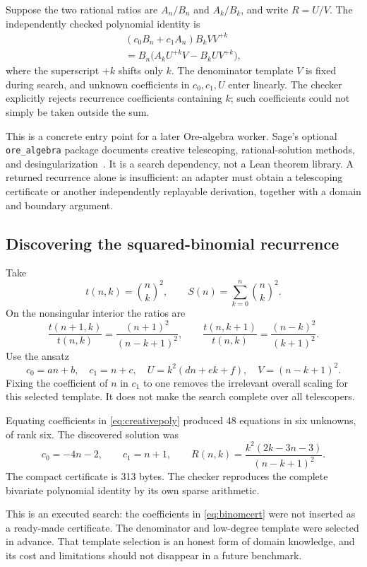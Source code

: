 \documentclass[11pt,letterpaper]{article}
\newcommand{\code}[1]{\texttt{#1}}
\theoremstyle{definition}\newtheorem{definition}[theorem]{Definition}
\theoremstyle{remark}\newtheorem{remark}[theorem]{Remark}
\begin{document}
Suppose the two rational ratios are $A_n/B_n$ and $A_k/B_k$, and write
$R=U/V$. The independently checked polynomial identity is
\begin{multline}
 (c_0B_n+c_1A_n)B_k V V^{+k}\\
 =B_n\bigl(A_k U^{+k}V-B_k U V^{+k}\bigr),
 \label{eq:creativepoly}
\end{multline}
where the superscript $+k$ shifts only $k$. The denominator template $V$ is
fixed during search, and unknown coefficients in $c_0,c_1,U$ enter linearly.
The checker explicitly rejects recurrence coefficients containing $k$; such
coefficients could not simply be taken outside the sum.

This is a concrete entry point for a later Ore-algebra worker. Sage's optional
\code{ore\_algebra} package documents creative telescoping, rational-solution
methods, and desingularization~\cite{ore-algebra}. It is a search dependency,
not a Lean theorem library. A returned recurrence alone is insufficient: an
adapter must obtain a telescoping certificate or another independently
replayable derivation, together with a domain and boundary argument.

\subsection{Discovering the squared-binomial recurrence}
Take
\[
 t(n,k)=\binom nk^2,\qquad S(n)=\sum_{k=0}^{n}\binom nk^2.
\]
On the nonsingular interior the ratios are
\[
 \frac{t(n+1,k)}{t(n,k)}=\frac{(n+1)^2}{(n-k+1)^2},\qquad
 \frac{t(n,k+1)}{t(n,k)}=\frac{(n-k)^2}{(k+1)^2}.
\]
Use the ansatz
\[
 c_0=an+b,\quad c_1=n+c,\quad
 U=k^2(dn+ek+f),\quad V=(n-k+1)^2.
\]
Fixing the coefficient of $n$ in $c_1$ to one removes the irrelevant overall
scaling for this selected template. It does not make the search complete over
all telescopers.

Equating coefficients in \eqref{eq:creativepoly} produced 48 equations in six
unknowns, of rank six. The discovered solution was
\begin{equation}
 c_0=-4n-2,\qquad c_1=n+1,\qquad
 R(n,k)=\frac{k^2(2k-3n-3)}{(n-k+1)^2}.
 \label{eq:binomcert}
\end{equation}
The compact certificate is 313 bytes. The checker reproduces the complete
bivariate polynomial identity by its own sparse arithmetic.

This is an executed search: the coefficients in \eqref{eq:binomcert} were not
inserted as a ready-made certificate. The denominator and low-degree template
were selected in advance. That template selection is an honest form of domain
knowledge, and its cost and limitations should not disappear in a future
benchmark.
\end{document}
